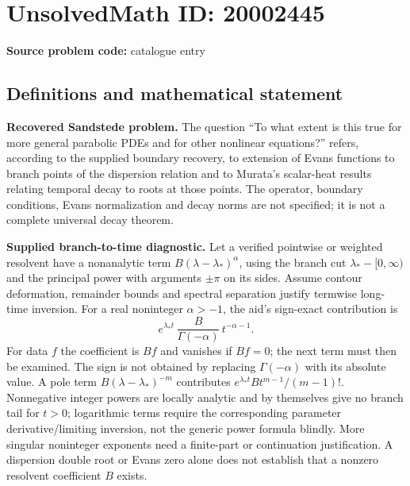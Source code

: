 \documentclass[11pt]{article}
\begin{document}
\section*{UnsolvedMath ID: 20002445}
\textbf{Source problem code:} catalogue entry
\subsection{Definitions and mathematical statement}
\textbf{Recovered Sandstede problem.} The question ``To what extent is this true for more general parabolic PDEs and for other nonlinear equations?'' refers, according to the supplied boundary recovery, to extension of Evans functions to branch points of the dispersion relation and to Murata's scalar-heat results relating temporal decay to roots at those points. The operator, boundary conditions, Evans normalization and decay norms are not specified; it is not a complete universal decay theorem.

\textbf{Supplied branch-to-time diagnostic.} Let a verified pointwise or weighted resolvent have a nonanalytic term $B(\lambda-\lambda_*)^\alpha$, using the branch cut $\lambda_*-[0,\infty)$ and the principal power with arguments $\pm\pi$ on its sides. Assume contour deformation, remainder bounds and spectral separation justify termwise long-time inversion. For a real noninteger $\alpha>-1$, the aid's sign-exact contribution is
\[
 e^{\lambda_*t}\,\frac{B}{\Gamma(-\alpha)}\,t^{-\alpha-1}.
\]
For data $f$ the coefficient is $Bf$ and vanishes if $Bf=0$; the next term must then be examined. The sign is not obtained by replacing $\Gamma(-\alpha)$ with its absolute value. A pole term $B(\lambda-\lambda_*)^{-m}$ contributes $e^{\lambda_*t}Bt^{m-1}/(m-1)!$. Nonnegative integer powers are locally analytic and by themselves give no branch tail for $t>0$; logarithmic terms require the corresponding parameter derivative/limiting inversion, not the generic power formula blindly. More singular noninteger exponents need a finite-part or continuation justification. A dispersion double root or Evans zero alone does not establish that a nonzero resolvent coefficient $B$ exists.
\end{document}
